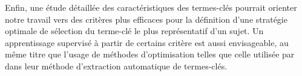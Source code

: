  Enfin, une étude détaillée des caractéristiques des termes-clés pourrait
  orienter notre travail vers des critères plus efficaces pour la définition
  d'une stratégie \og{}optimale\fg{} de sélection du terme-clé le plus
  représentatif d'un sujet. Un apprentissage supervisé à partir de certains
  critère est aussi envisageable, au même titre que l'usage de méthodes
  d'optimisation telles que celle utilisée par
   dans leur méthode d'extraction
  automatique de termes-clés.

